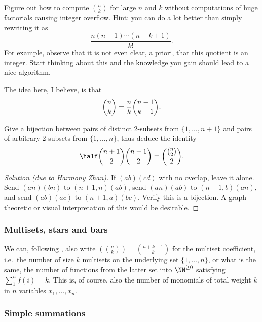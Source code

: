 \begin{exercise}
Figure out how to compute $\binom{n}{k}$ for large $n$ and $k$ without computations of huge factorials causing integer overflow. Hint: you can do a lot better than simply rewriting it as
\[ \frac{n(n-1)\cdots(n-k+1)}{k!}. \]
For example, observe that it is not even clear, a priori, that this quotient is an integer. Start thinking about this and the knowledge you gain should lead to a nice algorithm.
\end{exercise} 

\begin{soln}
The idea here, I believe, is that
\[ \binom{n}{k} = \frac{n}{k} \binom{n-1}{k-1}. \qedhere \]
\end{soln}

\begin{exercise} %
Give a bijection between pairs of distinct 2-subsets from $\{ 1, \ldots, n+1 \}$ and pairs of arbitrary 2-subsets from $\{ 1, \ldots, n \}$, thus deduce the identity
\[ \half \binom{n+1}{2} \binom{n-1}{2} = \binom{\binom{n}{2}}{2}. \]
\end{exercise}

\begin{proof}[Solution (due to Harmony Zhan)]
If $(ab)(cd)$ with no overlap, leave it alone. Send $(an)(bn)$ to $(n+1,n)(ab)$, send $(an)(ab)$ to $(n+1,b)(an)$, and send $(ab)(ac)$ to $(n+1,a)(bc)$. Verify this is a bijection. A graph-theoretic or visual interpretation of this would be desirable.
\end{proof}

\subsubsection*{Multisets, stars and bars}

We can, following \cite{Sta1}, also write $\left( \!\! {n \choose k} \!\! \right) = \binom{n+k-1}{k}$ for the multiset coefficient, i.e.\ the number of size $k$ multisets on the underlying set $\{ 1, \ldots, n \}$, or what is the same, the number of functions from the latter set into $\NN^{\geq 0}$ satisfying $\sum_1^n f(i) = k$. This is, of course, also the number of monomials of total weight $k$ in $n$ variables $x_1, \ldots, x_n$.

\subsubsection*{Simple summations}

